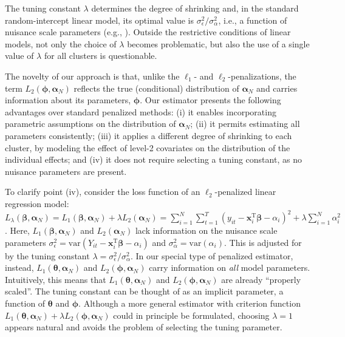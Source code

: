 \documentclass[12pt]{article}
\def\T{{ \mathrm{\scriptscriptstyle T} }}
\def\thetavec{\bm{\theta}}
\def\phivec{\bm{\phi}}
\def\betavec{\bm{\beta}}
\def\aa{\bm{\alpha}_N}
\def\xx{\bm{x}}
\begin{document}
The tuning constant $\lambda$ determines the degree of shrinking and,
in the standard random-intercept linear model, its optimal value is $\sigma^2_{\epsilon}/\sigma^2_{\alpha}$,
i.e., a function of nuisance scale parameters (e.g., \citealp{koenker2004}). %
Outside the restrictive conditions of linear models, not only the choice of $\lambda$ becomes problematic,
but also the use of a single value of $\lambda$ for all clusters is questionable.


The novelty of our approach is that, unlike the $\ell_1$- and $\ell_2$-penalizations, 
the term $L_2(\phivec, \aa)$ reflects the true (conditional) distribution of $\aa$ and carries information about its parameters, $\phivec$. 
Our estimator presents the following advantages over standard penalized methods:
(i) it enables incorporating parametric assumptions on the distribution of $\aa$;
(ii) it permits estimating all parameters consistently; 
(iii) it applies a different degree of shrinking to each cluster, by modeling the effect of level-2 covariates 
on the distribution of the individual effects; and 
(iv) it does not require selecting a tuning constant, as no nuisance parameters are present.


To clarify point (iv), consider the loss function of an $\ell_2$-penalized linear regression model:
$L_{\lambda}(\betavec, \aa) = L_1(\betavec, \aa) + \lambda L_2(\aa) = 
\sum_{i = 1}^N\sum_{t = 1}^T{(y_{it} - \xx_i^\T\betavec - \alpha_i)^2} + \lambda \sum_{i = 1}^N \alpha_i^2$.
Here, $L_1(\betavec, \aa)$ and $L_2(\aa)$ lack information on the nuisance scale parameters
$\sigma^2_{\epsilon} = \text{var}(Y_{it} - \xx_i^\T\betavec - \alpha_i)$ and $\sigma^2_{\alpha} = \text{var}(\alpha_i)$.
This is adjusted for by the tuning constant $\lambda = \sigma^2_{\epsilon}/\sigma^2_{\alpha}$.
In our special type of penalized estimator, instead, $L_1(\thetavec,\aa)$ and $L_2(\phivec,\aa)$ carry information on \textit{all} model parameters.
Intuitively, this means that $L_1(\thetavec,\aa)$ and $L_2(\phivec,\aa)$ are already ``properly scaled''.
The tuning constant can be thought of as an implicit parameter, a function of $\thetavec$ and $\phivec$. 
Although a more general estimator with criterion function $L_1(\thetavec,\aa) + \lambda L_2(\phivec,\aa)$ 
could in principle be formulated, choosing $\lambda = 1$ appears natural and avoids the problem of
selecting the tuning parameter. 

\end{document}
